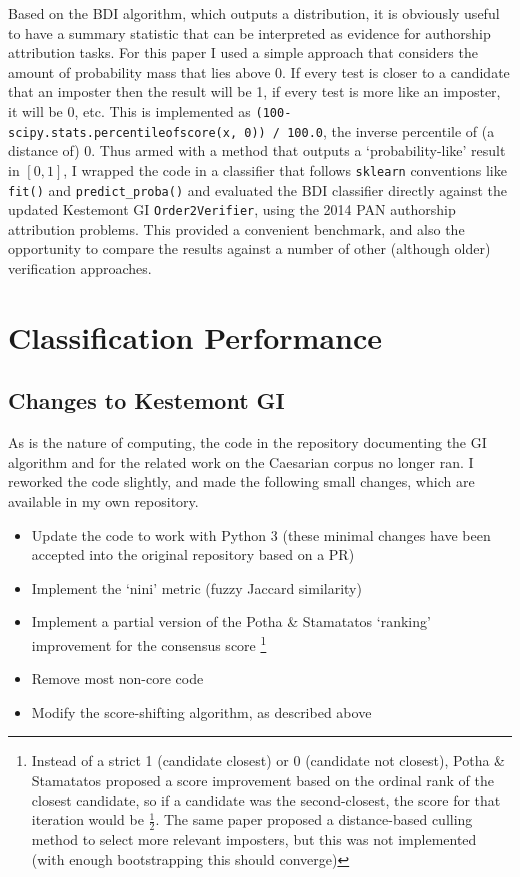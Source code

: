 \documentclass[
    hf,
]{ceurart}
\begin{document}
Based on the BDI algorithm, which outputs a distribution, it is obviously useful
to have a summary statistic that can be interpreted as evidence for authorship
attribution tasks. For this paper I used a simple approach that considers the
amount of probability mass that lies above 0. If every test is closer to a
candidate that an imposter then the result will be 1, if every test is more like
an imposter, it will be 0, etc. This is implemented as
\texttt{(100-scipy.stats.percentileofscore(x, 0)) / 100.0}, the
inverse percentile of (a distance of) 0. Thus armed with a method that outputs a
`probability-like' result in $[0,1]$, I wrapped the code in a classifier that
follows \texttt{sklearn} conventions like \texttt{fit()} and
\texttt{predict\_proba()}  and evaluated the BDI classifier directly against the
updated Kestemont GI \texttt{Order2Verifier}, using the 2014 PAN authorship
attribution problems. This provided a convenient benchmark, and also the
opportunity to compare the results against a number of other (although older)
verification approaches.

\section{Classification Performance}

\subsection{Changes to Kestemont GI}

As is the nature of computing, the code in the repository documenting the GI
algorithm and for the related work on the Caesarian corpus no longer ran. I
reworked the code slightly, and made the following small changes, which are
available in my own repository.

\begin{itemize}
    \item Update the code to work with Python 3 (these minimal changes have been
          accepted into the original repository based on a PR)
    \item Implement the `nini' metric (fuzzy Jaccard similarity)
    \item Implement a partial version of the Potha \& Stamatatos `ranking'
          improvement for the consensus score%
          \footnote{ Instead of a strict 1 (candidate closest) or 0 (candidate
              not closest), Potha \& Stamatatos proposed a score improvement
              based on the ordinal rank of the closest candidate, so if a
              candidate was the second-closest, the score for that iteration
              would be $\frac{1}{2}$. The same paper proposed a distance-based
              culling method to select more relevant imposters, but this was not
              implemented (with enough bootstrapping this should converge)}
    \item Remove most non-core code
    \item Modify the score-shifting algorithm, as described above
\end{itemize}
\end{document}
